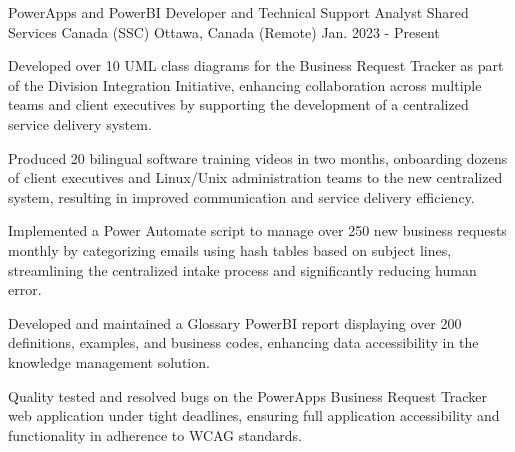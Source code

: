 

\begin{cventries}
\cventry
  {PowerApps and PowerBI Developer and Technical Support Analyst} %
  {Shared Services Canada (SSC)} %
  {Ottawa, Canada (Remote)} %
  {Jan. 2023 - Present} %
  {
    \begin{cvitems} %
      \item {Developed over 10 UML class diagrams for the Business Request Tracker as part of the Division Integration Initiative, enhancing collaboration across multiple teams and client executives by supporting the development of a centralized service delivery system.}
      \item {Produced 20 bilingual software training videos in two months, onboarding dozens of client executives and Linux/Unix administration teams to the new centralized system, resulting in improved communication and service delivery efficiency.}
      \item {Implemented a Power Automate script to manage over 250 new business requests monthly by categorizing emails using hash tables based on subject lines, streamlining the centralized intake process and significantly reducing human error.}
      \item {Developed and maintained a Glossary PowerBI report displaying over 200 definitions, examples, and business codes, enhancing data accessibility in the knowledge management solution.}
      \item {Quality tested and resolved bugs on the PowerApps Business Request Tracker web application under tight deadlines, ensuring full application accessibility and functionality in adherence to WCAG standards.}
    \end{cvitems}
  }


\end{cventries}
